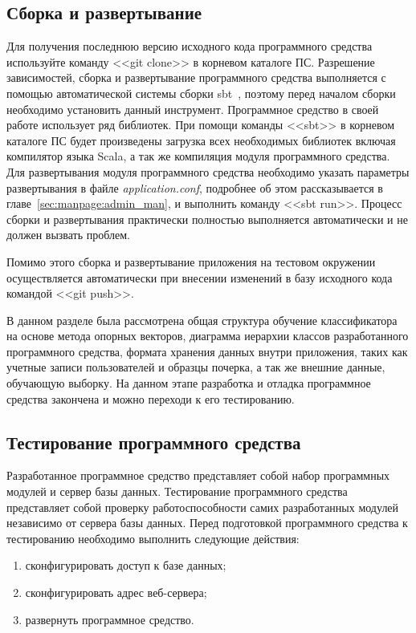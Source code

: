 \subsection{Сборка и развертывание}
Для получения последнюю версию исходного кода программного средства используйте команду <<git clone>> в корневом каталоге ПС. Разрешение зависимостей, сборка и развертывание программного средства выполняется с помощью автоматической системы сборки sbt~\cite{sbt}, поэтому перед началом сборки необходимо установить данный инструмент. Программное средство в своей работе использует ряд библиотек. При помощи команды <<sbt>> в корневом каталоге ПС будет произведены загрузка всех необходимых библиотек включая компилятор языка Scala, а так же компиляция модуля программного средства.
Для развертывания модуля программного средства необходимо указать параметры развертывания в файле \emph{application.conf}, подробнее об этом рассказывается в главе~\ref{sec:manpage:admin_man}, и выполнить команду <<sbt run>>. Процесс сборки и развертывания практически полностью выполняется автоматически и не должен вызвать проблем.

Помимо этого сборка и развертывание приложения на тестовом окружении осуществляется автоматически при внесении изменений в базу исходного кода командой <<git push>>.

В данном разделе была рассмотрена общая структура обучение классификатора на основе метода опорных векторов, диаграмма иерархии классов разработанного программного средства, формата хранения данных внутри приложения, таких как учетные записи пользователей и образцы почерка, а так же внешние данные, обучающую выборку. На данном этапе разработка и отладка программное средства закончена и можно переходи к его тестированию.

\subsection{Тестирование программного средства}
\label{sec:testing}
Разработанное программное средство представляет собой набор программных модулей и сервер базы данных. Тестирование программного средства представляет собой проверку работоспособности самих разработанных модулей независимо от сервера базы данных. 
Перед подготовкой программного средства к тестированию необходимо выполнить следующие действия:
\begin{enumerate}
  \item сконфигурировать доступ к базе данных;
  \item сконфигурировать адрес веб-сервера;
  \item развернуть программное средство.
\end{enumerate}

